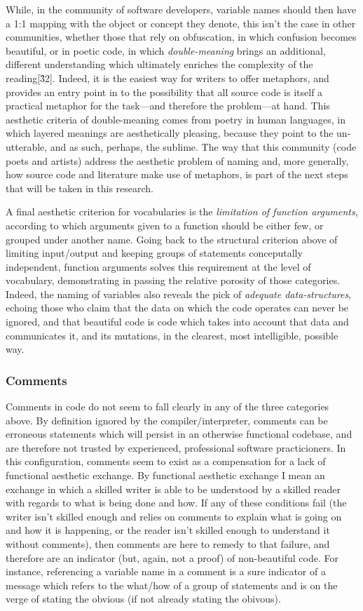While, in the community of software developers, variable names should then have a 1:1 mapping with the object or concept they denote, this isn't the case in other communities, whether those that rely on obfuscation, in which confusion becomes beautiful, or in poetic code, in which \emph{double-meaning} brings an additional, different understanding which ultimately enriches the complexity of the reading[\^32]. Indeed, it is the easiest way for writers to offer metaphors, and provides an entry point in to the possibility that all source code is itself a practical metaphor for the task—and therefore the problem—at hand. This aesthetic criteria of double-meaning comes from poetry in human languages, in which layered meanings are aesthetically pleasing, because they point to the un-utterable, and as such, perhaps, the sublime. The way that this community (code poets and artists) address the aesthetic problem of naming and, more generally, how source code and literature make use of metaphors, is part of the next steps that will be taken in this research.

A final aesthetic criterion for vocabularies is the \emph{limitation of function arguments}, according to which arguments given to a function should be either few, or grouped under another name. Going back to the structural criterion above of limiting input/output and keeping groups of statements conceputally independent, function arguments solves this requirement at the level of vocabulary, demonstrating in passing the relative porosity of those categories. Indeed, the naming of variables also reveals the pick of \emph{adequate data-structures}, echoing those who claim that the data on which the code operates can never be ignored, and that beautiful code is code which takes into account that data and communicates it, and its mutations, in the clearest, most intelligible, possible way.

\subsubsection{Comments}
\label{subsubsec:framework-comments}

Comments in code do not seem to fall clearly in any of the three categories above. By definition ignored by the compiler/interpreter, comments can be erroneous statements which will persist in an otherwise functional codebase, and are therefore not trusted by experienced, professional software practicioners. In this configuration, comments seem to exist as a compensation for a lack of functional aesthetic exchange. By functional aesthetic exchange I mean an exchange in which a skilled writer is able to be understood by a skilled reader with regards to what is being done and how. If any of these conditions fail (the writer isn't skilled enough and relies on comments to explain what is going on and how it is happening, or the reader isn't skilled enough to understand it without comments), then comments are here to remedy to that failure, and therefore are an indicator (but, again, not a proof) of non-beautiful code. For instance, referencing a variable name in a comment is a sure indicator of a message which refers to the what/how of a group of statements and is on the verge of stating the obvious (if not already stating the obivous).

